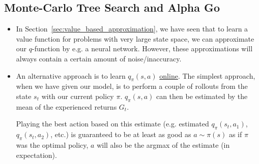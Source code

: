 \subsection{Monte-Carlo Tree Search and Alpha Go}
\label{sec:MCTS_Alpha_Go}
\begin{itemize}
	\item In Section~\ref{sec:value_based_approximation}, we have seen that to learn a value function for problems with very large state space, we can approximate our $q$-function by e.g. a neural network. However, these approximations will always contain a certain amount of noise/inaccuracy.
	\item An alternative approach is to learn $q_{\pi}(s,a)$ \underline{online}. The simplest approach, when we have given our model, is to perform a couple of rollouts from the state $s_t$ with our current policy $\pi$. $q_{\pi}(s,a)$ can then be estimated by the mean of the experienced returns $G_t$.
	
	Playing the best action based on this estimate (e.g. estimated $q_{\pi}(s_t,a_1)$, $q_{\pi}(s_t,a_2)$, etc.) is guaranteed to be at least as good as $a\sim \pi(s)$ as if $\pi$ was the optimal policy, $a$ will also be the argmax of the estimate (in expectation).
\end{itemize}
